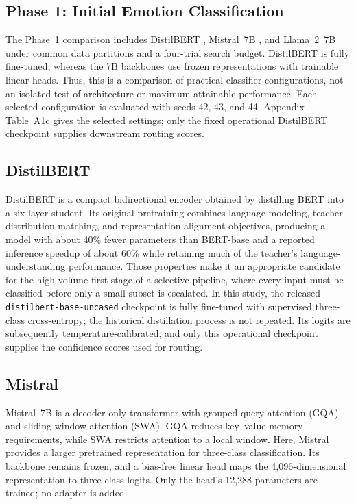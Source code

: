 \documentclass{ieeeaccess}
\begin{document}
\subsection{Phase 1: Initial Emotion Classification}

The Phase~1 comparison includes DistilBERT \cite{ref12}, Mistral~7B \cite{ref13}, and Llama~2~7B \cite{ref14} under common data partitions and a four-trial search budget. DistilBERT is fully fine-tuned, whereas the 7B backbones use frozen representations with trainable linear heads. Thus, this is a comparison of practical classifier configurations, not an isolated test of architecture or maximum attainable performance. Each selected configuration is evaluated with seeds 42, 43, and 44. Appendix Table~A1c gives the selected settings; only the fixed operational DistilBERT checkpoint supplies downstream routing scores.

\subsection{DistilBERT}

DistilBERT \cite{ref12} is a compact bidirectional encoder obtained by distilling BERT into a six-layer student. Its original pretraining combines language-modeling, teacher-distribution matching, and representation-alignment objectives, producing a model with about 40\% fewer parameters than BERT-base and a reported inference speedup of about 60\% while retaining much of the teacher's language-understanding performance. Those properties make it an appropriate candidate for the high-volume first stage of a selective pipeline, where every input must be classified before only a small subset is escalated. In this study, the released \texttt{distilbert-base-uncased} checkpoint is fully fine-tuned with supervised three-class cross-entropy; the historical distillation process is not repeated. Its logits are subsequently temperature-calibrated, and only this operational checkpoint supplies the confidence scores used for routing.

\subsection{Mistral}

Mistral~7B \cite{ref13} is a decoder-only transformer with grouped-query attention (GQA) and sliding-window attention (SWA). GQA reduces key--value memory requirements, while SWA restricts attention to a local window. Here, Mistral provides a larger pretrained representation for three-class classification. Its backbone remains frozen, and a bias-free linear head maps the 4,096-dimensional representation to three class logits. Only the head's 12,288 parameters are trained; no adapter is added.
\end{document}
